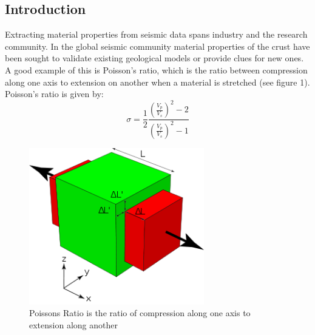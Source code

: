 \documentclass[jgrga]{agutex}
\begin{document}
%
%

%

\begin{article}

%
%

\section{Introduction}

Extracting material properties from seismic data spans industry and the research community. In the global seismic community material properties of the crust have been sought to validate existing geological models or provide clues for new ones. A good example of this is Poisson's ratio, which is the ratio between compression along one axis to extension on another when a material is stretched (see figure 1). Poisson's ratio is given by:
\[ \sigma = \frac{1}{2} \frac{ \left( \frac{ V_p }{ V_s } \right)^2 - 2 }{ \left( \frac{ V_p }{ V_s } \right)^2 - 1 } \]

\begin{figure}
\noindent\includegraphics[width=18pc]{PoissonRatio.png}
\caption{Poissons Ratio is the ratio of compression along one axis to extension along another}
\end{figure}


\end{article}
\end{document}
